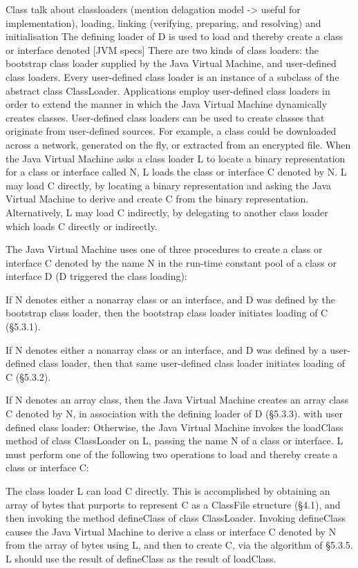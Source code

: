Class 
talk about classloaders (mention delagation model -> useful for implementation), loading, linking (verifying, preparing, and resolving) and initialisation
The defining loader of D is used to load and thereby create a class or interface denoted [JVM specs] 
There are two kinds of class loaders: the bootstrap class loader supplied by the Java Virtual Machine, and user-defined class loaders. Every user-defined class loader is an instance of a subclass of the abstract class ClassLoader. Applications employ user-defined class loaders in order to extend the manner in which the Java Virtual Machine dynamically creates classes. User-defined class loaders can be used to create classes that originate from user-defined sources. For example, a class could be downloaded across a network, generated on the fly, or extracted from an encrypted file. 
When the Java Virtual Machine asks a class loader L to locate a binary representation for a class or interface called N, L loads the class or interface C denoted by N. L may load C directly, by locating a binary representation and asking the Java Virtual Machine to derive and create C from the binary representation. Alternatively, L may load C indirectly, by delegating to another class loader which loads C directly or indirectly. 


The Java Virtual Machine uses one of three procedures to create a class or interface C denoted by the name N in the run-time constant pool of a class or interface D (D triggered the class loading):

    If N denotes either a nonarray class or an interface, and D was defined by the bootstrap class loader, then the bootstrap class loader initiates loading of C (§5.3.1).

    If N denotes either a nonarray class or an interface, and D was defined by a user-defined class loader, then that same user-defined class loader initiates loading of C (§5.3.2).

    If N denotes an array class, then the Java Virtual Machine creates an array class C denoted by N, in association with the defining loader of D (§5.3.3). 
with user defined class loader:
Otherwise, the Java Virtual Machine invokes the loadClass method of class ClassLoader on L, passing the name N of a class or interface. L must perform one of the following two operations to load and thereby create a class or interface C:

    The class loader L can load C directly. This is accomplished by obtaining an array of bytes that purports to represent C as a ClassFile structure (§4.1), and then invoking the method defineClass of class ClassLoader. Invoking defineClass causes the Java Virtual Machine to derive a class or interface C denoted by N from the array of bytes using L, and then to create C, via the algorithm of §5.3.5. L should use the result of defineClass as the result of loadClass.

